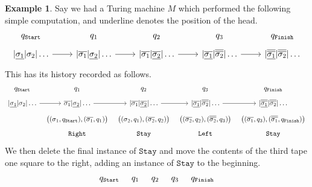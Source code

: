 \documentclass[12pt]{article}
\theoremstyle{plain}
\theoremstyle{definition}
\newtheorem{example}[thm]{Example}
\begin{document}
	\begin{example}
		Say we had a Turing machine $M$ which performed the following simple computation, and underline denotes the position of the head.
		\begin{equation}\label{eq:example}
			\begin{tikzcd}[row sep = tiny]
				{q_{\texttt{Start}}} & {q_1} & {q_2} & q_3 & {q_{\texttt{Finish}}}\\
					{|\underline{\sigma_1}|\sigma_2|\ldots}\arrow[r] & {|\overline{\sigma_1}|\underline{\sigma_2}|\ldots}\arrow[r] & {|\overline{\sigma_1}|\underline{\overline{\sigma_2}}|\ldots}\arrow[r] & {|\underline{\overline{\sigma_1}}|\overline{\overline{\sigma_2}}|\ldots}\arrow[r] & {|\underline{\overline{\overline{\sigma_1}}}|\overline{\overline{\sigma_2}}|\ldots}
				\end{tikzcd}
			\end{equation}
		This has its history recorded as follows.
		\begin{equation*}
			\begin{tikzcd}[row sep = tiny, column sep = tiny]
				{q_{\texttt{Start}}} & {q_1} & {q_2} & q_3 & {q_{\texttt{Finish}}}\\
				{|\underline{\sigma_1}|\sigma_2|\ldots}\arrow[r] & {\overline{\sigma_1}|\underline{\sigma_2}|\ldots}\arrow[r] & {|\overline{\sigma_1}|\underline{\overline{\sigma_2}}|\ldots}\arrow[r] & {|\underline{\overline{\sigma_1}}|\overline{\overline{\sigma_2}}|\ldots}\arrow[r] & {|\underline{\overline{\overline{\sigma_1}}}|\overline{\overline{\sigma_2}}|\ldots}\\
				& {\big((\sigma_1, q_{\texttt{Start}}), (\overline{\sigma_1}, q_1)\big)} & {\big((\sigma_2, q_1), (\overline{\sigma_2}, q_2)\big)} & {\big((\overline{\sigma_2}, q_2), (\overline{\overline{\sigma_2}}, q_3)\big)} & {\big((\overline{\sigma_1}, q_3), (\overline{\overline{\sigma_1}}, q_{\texttt{Finish}})\big)}\\
				& \texttt{Right} & \texttt{Stay} & \texttt{Left} & \texttt{Stay}
			\end{tikzcd}
		\end{equation*}
	We then delete the final instance of $\texttt{Stay}$ and move the contents of the third tape one square to the right, adding an instance of $\texttt{Stay}$ to the beginning.
	\begin{equation*}
		\begin{tikzcd}[row sep = tiny, column sep = tiny]
			{q_{\texttt{Start}}} & {q_1} & {q_2} & q_3 & {q_{\texttt{Finish}}}\\

\end{tikzcd}
\end{equation*}
\end{example}
\end{document}

